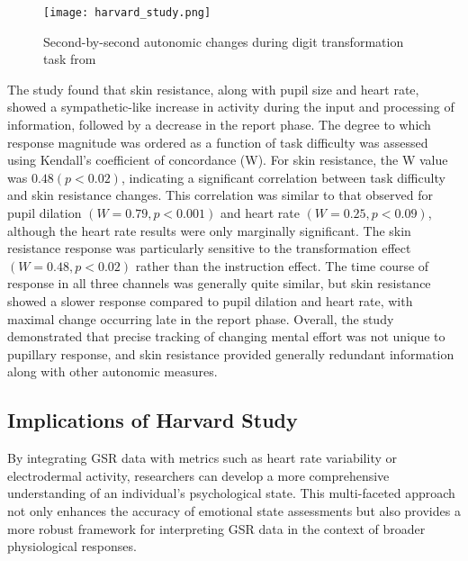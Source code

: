 \documentclass[twocolumn]{article}
\begin{document}
    \begin{figure}[H]
    \centering
    \texttt{[image: harvard\_study.png]}
    \caption{Second-by-second autonomic changes
    during digit transformation task from \cite{imotionsGalvanicSkin}}
    \label{fig:NR}
    \end{figure}

The study found that skin resistance, along with pupil size and heart rate, showed a sympathetic-like increase in activity during the input and processing of information, followed by a decrease in the report phase. The degree to which response magnitude was ordered as a function of task difficulty was assessed using Kendall's coefficient of concordance (W). For skin resistance, the W value was $0.48 (p < 0.02)$, indicating a significant correlation between task difficulty and skin resistance changes. This correlation was similar to that observed for pupil dilation $(W = 0.79, p < 0.001)$ and heart rate $(W = 0.25, p < 0.09)$, although the heart rate results were only marginally significant. The skin resistance response was particularly sensitive to the transformation effect $(W = 0.48, p < 0.02)$ rather than the instruction effect. The time course of response in all three channels was generally quite similar, but skin resistance showed a slower response compared to pupil dilation and heart rate, with maximal change occurring late in the report phase. Overall, the study demonstrated that precise tracking of changing mental effort was not unique to pupillary response, and skin resistance provided generally redundant information along with other autonomic measures.\cite{article}

\subsection{Implications of Harvard Study}

By integrating GSR data with metrics such as heart rate variability or electrodermal activity, researchers can develop a more comprehensive understanding of an individual's psychological state. This multi-faceted approach not only enhances the accuracy of emotional state assessments but also provides a more robust framework for interpreting GSR data in the context of broader physiological responses.\cite{Abdel-Latif_Rashid_Askari_Park_Sharp_Quinn_Cinar_2023}
\end{document}
